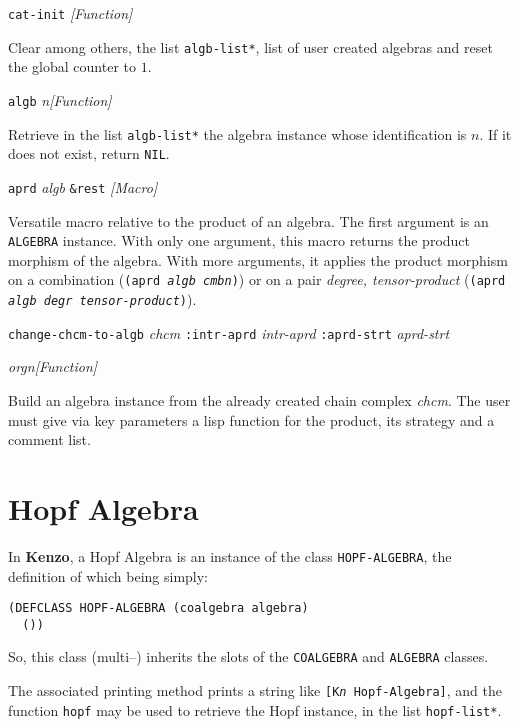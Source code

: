 {\parindent=0mm
{\leftskip=5mm
{\tt cat-init} \hfill {\em [Function]} \par}
{\leftskip=15mm
Clear among others, the list {\tt *algb-list*}, list of user created algebras  and reset
the global counter to $1$. \par}
{\leftskip=5mm
{\tt algb} {\em n}\hfill {\em [Function]} \par}
{\leftskip=15mm
Retrieve in the list {\tt *algb-list*} the algebra  instance whose identification is $n$.
If it does not exist, return {\tt NIL}. \par}
{\leftskip=5mm
{\tt aprd} {\em algb} {\tt \&rest} \hfill {\em [Macro]} \par}
{\leftskip=15mm
Versatile macro relative to the product of an algebra. The first argument is an {\tt ALGEBRA}
instance. With only one argument, this macro returns the product morphism of the algebra.
With more arguments, it applies the product morphism on a combination ({\tt (aprd {\em algb cmbn})})
or on a pair {\em degree, tensor-product} ({\tt (aprd {\em algb degr tensor-product})}). \par}
{\leftskip=5mm
{\tt change-chcm-to-algb} {\em chcm} {\tt :intr-aprd} {\em intr-aprd} {\tt :aprd-strt} {\em aprd-strt} \par
\hspace* {10mm}{\tt :orgn} {\em orgn}\hfill {\em [Function]} \par}
{\leftskip=15mm
Build an algebra instance from the already created chain complex {\em chcm}. The user must give via key
parameters a lisp function for the product, its strategy and a comment list. \par}
}

\section {Hopf Algebra}

In {\bf Kenzo}, a Hopf Algebra is an instance 
of the class {\tt HOPF-ALGEBRA}, the definition of which being simply:
{\footnotesize\begin{verbatim}
(DEFCLASS HOPF-ALGEBRA (coalgebra algebra)
  ())
\end{verbatim}}
So, this class (multi--) inherits the slots of the {\tt COALGEBRA} and {\tt ALGEBRA} classes.
\par
The  associated printing method prints a string like 
{\tt [K{\em n} Hopf-Algebra]},  and the function {\tt hopf} may be used to retrieve the
Hopf instance, in the list {\tt *hopf-list*}.

